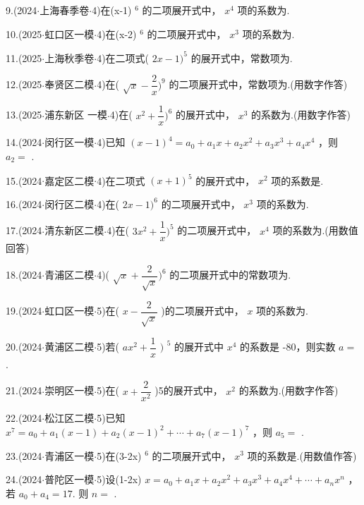 9.(2024$\cdot$上海春季卷$\cdot$4)在(x-1) $^{6}$ 的二项展开式中， ${x}^{4}$ 项的系数为\blkda[2]{}.

10.(2025$\cdot$虹口区一模$\cdot$4)在(x-2) $^{6}$ 的二项展开式中， ${x}^{3}$ 项的系数为\blkda[2]{}.

11.(2025$\cdot$上海秋季卷$\cdot$4)在二项式( ${2x} - 1{)}^{5}$ 的展开式中，常数项为\blkda[2]{}.

12.(2025$\cdot$奉贤区二模$\cdot$4)在( $\sqrt{x} - \dfrac{2}{x}{)}^{9}$ 的二项展开式中，常数项为\blkda[2]{}.(用数字作答)

13.(2025$\cdot$浦东新区 一模$\cdot$4)在( ${x}^{2} + \dfrac{1}{x}{)}^{6}$ 的展开式中， ${x}^{3}$ 的系数为\blkda[2]{}.(用数字作答)

14.(2024$\cdot$闵行区一模$\cdot$4)已知 ${\left( x - 1\right) }^{4} = {a}_{0} + {a}_{1}x + {a}_{2}{x}^{2} + {a}_{3}{x}^{3} + {a}_{4}{x}^{4}$ ，则 ${a}_{2} =$ \blkda[2]{}.

15.(2024$\cdot$嘉定区二模$\cdot$4)在二项式 ${\left( x + 1\right) }^{5}$ 的展开式中， ${x}^{2}$ 项的系数是\blkda[2]{}.

16.(2024$\cdot$闵行区二模$\cdot$4)在( ${2x} - 1{)}^{6}$ 的二项展开式中， ${x}^{3}$ 项的系数为\blkda[2]{}.

17.(2024$\cdot$清东新区二模$\cdot$4)在( $3{x}^{2} + \dfrac{1}{x}{)}^{5}$ 的二项展开式中， ${x}^{4}$ 项的系数为\blkda[2]{}.(用数值回答)

18.(2024$\cdot$青浦区二模$\cdot$4)( $\sqrt{x} + \dfrac{2}{\sqrt{x}}{)}^{6}$ 的二项展开式中的常数项为\blkda[2]{}.

19.(2024$\cdot$虹口区一模$\cdot$5)在( $x - \dfrac{2}{\sqrt{x}}$ )的二项展开式中， $x$ 项的系数为\blkda[2]{}.

20.(2024$\cdot$黄浦区二模$\cdot$5)若( $a{x}^{2} + \dfrac{1}{x}{\text{ ) }}^{5}$ 的展开式中 ${x}^{4}$ 的系数是 -80，则实数 $a =$ \blkda[2]{}.

21.(2024$\cdot$崇明区一模$\cdot$5)在( $x + \dfrac{2}{{x}^{2}}$ )5的展开式中， ${x}^{2}$ 的系数为\blkda[2]{}.(用数字作答)

22.(2024$\cdot$松江区二模$\cdot$5)已知 ${x}^{7} = {a}_{0} + {a}_{1}\left( {x - 1}\right)  + {a}_{2}{\left( x - 1\right) }^{2} + \cdots  + {a}_{7}{\left( x - 1\right) }^{7}$ ，则 ${a}_{5} =$ \blkda[2]{}.

23.(2024$\cdot$青浦区一模$\cdot$5)在(3-2x) $^{6}$ 的二项展开式中， ${x}^{3}$ 项的系数是\blkda[2]{}.(用数值作答)

24.(2024$\cdot$普陀区一模$\cdot$5)设(1-2x) $x = {a}_{0} + {a}_{1}x + {a}_{2}{x}^{2} + {a}_{3}{x}^{3} + {a}_{4}{x}^{4} + \cdots  + {a}_{n}{x}^{n}$ ，若 ${a}_{0} + {a}_{4} = {17}$. 则 $n =$ \blkda[2]{}.

